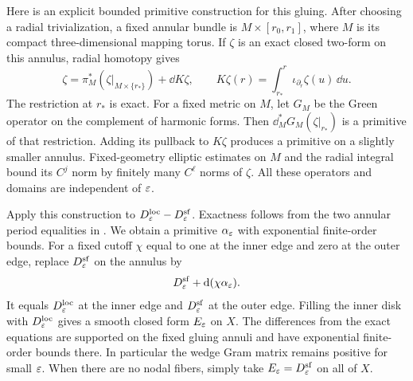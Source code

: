 Here is an explicit bounded primitive construction for this gluing.
After choosing a radial trivialization, a fixed annular bundle is
$M\times[r_0,r_1]$, where $M$ is its compact three-dimensional mapping
torus.  If $\zeta$ is an exact closed two-form on this annulus, radial
homotopy gives
\[
  \zeta=\pi_M^*(\zeta|_{M\times\{r_*\}})+\dd K\zeta,
  \qquad
  K\zeta(r)=\int_{r_*}^{r}\iota_{\partial_r}\zeta(u)\,\dd u.
\]
The restriction at $r_*$ is exact.  For a fixed metric on $M$, let
$G_M$ be the Green operator on the complement of harmonic forms.
Then $\dd_M^*G_M(\zeta|_{r_*})$ is a primitive of that restriction.
Adding its pullback to $K\zeta$ produces a primitive on a slightly
smaller annulus.  Fixed-geometry elliptic estimates on $M$ and the radial
integral bound its $C^j$ norm by finitely many $C^\ell$ norms of $\zeta$.
All these operators and domains are independent of $\varepsilon$.

Apply this construction to
$D^{\mathrm{loc}}_\varepsilon-D^{\mathrm{sf}}_\varepsilon$.  Exactness follows from
the two annular period equalities in .  We obtain
a primitive $\alpha_\varepsilon$ with exponential finite-order bounds.  For a
fixed cutoff $\chi$ equal to one at the inner edge and zero at the outer
edge, replace $D^{\mathrm{sf}}_\varepsilon$ on the annulus by
\[
  D^{\mathrm{sf}}_\varepsilon+\mathrm d(\chi\alpha_\varepsilon).
\]
It equals $D^{\mathrm{loc}}_\varepsilon$ at the inner edge and
$D^{\mathrm{sf}}_\varepsilon$ at the outer edge.  Filling the inner disk with
$D^{\mathrm{loc}}_\varepsilon$ gives a smooth closed form $E_\varepsilon$ on $X$.
The differences from the exact equations are supported on the fixed
gluing annuli and have exponential finite-order bounds there.  In
particular the wedge Gram matrix remains positive for small $\varepsilon$.
When there are no nodal fibers, simply take
$E_\varepsilon=D^{\mathrm{sf}}_\varepsilon$ on all of $X$.

